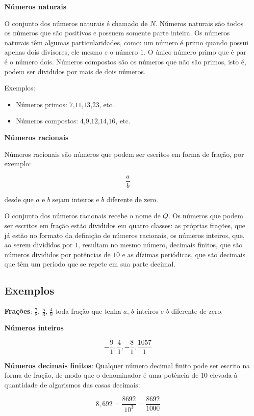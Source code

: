 \textbf{Números naturais}

O conjunto dos números naturais é chamado de $N$. Números naturais são
todos os números que são positivos e possuem somente parte inteira. Os
números naturais têm algumas particularidades, como: um número é primo
quando possui apenas dois divisores, ele mesmo e o número $1$. O único
número primo que é par é o número dois. Números compostos são os números
que não são primos, isto é, podem ser divididos por mais de dois
números.

Exemplos:

\begin{itemize}
\item Números primos: $7$,$11$,$13$,$23$, etc.
\item Números compostos: $4$,$9$,$12$,$14$,$16$, etc.
\end{itemize}

\textbf{Números racionais}

Números racionais são números que podem ser escritos em forma de fração,
por exemplo:

$$\frac{a}{b}$$

desde que $a$ e $b$ sejam inteiros e $b$ diferente de zero.

O conjunto dos números racionais recebe o nome de $Q$. Os números que
podem ser escritos em fração estão divididos em quatro classes: as
próprias frações, que já estão no formato da definição de números
racionais, os números inteiros, que, ao serem divididos por $1$, resultam
no mesmo número, decimais finitos, que são números divididos por
potências de $10$ e as dízimas periódicas, que são decimais que têm um
período que se repete em sua parte decimal.

\subsection{Exemplos}

\textbf{Frações}: $\frac{7}{8}$, $\frac{5}{3}$, $\frac{4}{9}$ toda fração que tenha $a$,
$b$ inteiros e $b$ diferente de zero.

\textbf{Números inteiros}

 $$-\frac{9}{1},  \frac{4}{1}, -\frac{8}{1},  \frac{1057}{1}$$

\textbf{Números decimais finitos}: Qualquer número decimal finito pode ser
escrito na forma de fração, de modo que o denominador é uma potência de
$10$ elevada à quantidade de algarismos das casas decimais:

$$8,692  = \frac{8692}{10^{3}} = \frac{8692}{1000}$$

